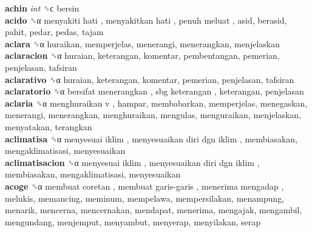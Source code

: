 \textbf{achin} \emph{int}  ␝ϲ  bersin  \\
\textbf{acido} ␝α   menyakiti hati ,  menyakitkan hati ,  penuh meluat , asid, berasid, pahit, pedar, pedas, tajam  \\
\textbf{aclara} ␝α  huraikan, memperjelas, menerangi, menerangkan, menjelaskan  \\
\textbf{aclaracion} ␝α  huraian, keterangan, komentar, pembentangan, pemerian, penjelasan, tafsiran  \\
\textbf{aclarativo} ␝α  huraian, keterangan, komentar, pemerian, penjelasan, tafsiran  \\
\textbf{aclaratorio} ␝α   bersifat menerangkan ,  sbg keterangan , keterangan, penjelasan  \\
\textbf{aclaria} ␝α   menghuraikan v , hampar, membabarkan, memperjelas, menegaskan, menerangi, menerangkan, menghuraikan, mengulas, menguraikan, menjelaskan, menyatakan, terangkan  \\
\textbf{aclimatisa} ␝α   menyesuai iklim ,  menyesuaikan diri dgn iklim , membiasakan, mengaklimatisasi, menyesuaikan  \\
\textbf{aclimatisacion} ␝α   menyesuai iklim ,  menyesuaikan diri dgn iklim , membiasakan, mengaklimatisasi, menyesuaikan  \\
\textbf{acoge} ␝α   membuat coretan ,  membuat garis-garis ,  menerima mengadap , melukis, memancing, meminum, mempelawa, mempersilakan, menampung, menarik, mencerna, mencernakan, mendapat, menerima, mengajak, mengambil, mengundang, menjemput, menyambut, menyerap, menyilakan, serap  \\
